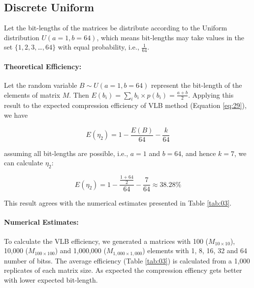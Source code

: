 \documentclass[10pt]{article}
\begin{document}
\subsection*{Discrete Uniform}
Let the bit-lengths of the matrices be distribute according to the Uniform distribution $U(a=1,b=64)$, which means bit-lengths may take values in the set $\{1, 2, 3, $\ldots$, 64\}$ with equal probability, i.e., $\frac{1}{64}$. 

\paragraph{Theoretical Efficiency:}
Let the random variable $B \sim U(a=1,b=64)$ represent the  bit-length of the elements of matrix $M$. Then $E(b_i) = \sum_{i} b_i \times p(b_i) = \frac{a+b}{2}$.  Applying this result to the expected compression efficiency of VLB method (Equation \ref{eq:29}), we have 

\begin{equation}\label{eq:44}
 E(\eta_2) = 1 - \frac{E(B)}{64} - \frac{k}{64} 
\end{equation}

assuming all bit-lengths are possible, i.e., $a=1$ and $b=64$, and hence $k=7$, we can calculate $\eta_2$:

\begin{equation}\label{eq:45}
 E(\eta_2) = 1 - \frac{\frac{1+64}{2}}{64} - \frac{7}{64} \approx 38.28\% 
\end{equation}

This result agrees with the numerical estimates presented in Table \ref{tab:03}.

\paragraph{Numerical Estimates:}
To calculate the VLB efficiency, we generated a matrices with 100 ($M_{10 \times 10}$), 10,000 ($M_{100 \times 100}$) and 1,000,000 ($M_{1,000 \times 1,000}$) elements with 1, 8, 16, 32 and 64 number of bitss.  The average efficiency (Table \ref{tab:03}) is calculated from a 1,000 replicates of each matrix size. As expected the compression effiency gets better with lower expected bit-length.
\end{document}
